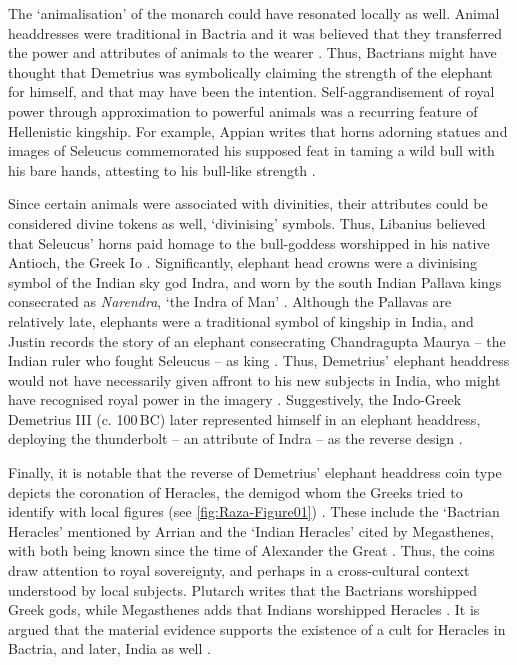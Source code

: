 \documentclass{ijsra}
\renewcommand\BC{{\,BC\xspace}}
\begin{document}
The ‘animalisation’ of the monarch could have resonated locally as well. Animal headdresses were traditional in Bactria and it was believed that they transferred the power and attributes of animals to the wearer \parencite[215--226]{Lerner2009}.
Thus, Bactrians might have thought that Demetrius was symbolically claiming the strength of the elephant for himself, and that may have been the intention.
Self-aggrandisement of royal power through approximation to powerful animals was a recurring feature of Hellenistic kingship.
For example, Appian writes that horns adorning statues and images of Seleucus commemorated his supposed feat in taming a wild bull with his bare hands,
attesting to his bull-like strength \parencites[53]{Alonso2014}[]{App. Syr. 57}[120]{Erickson2013}.

Since certain animals were associated with divinities, their attributes could be considered divine tokens as well, ‘divinising’ symbols.
Thus, Libanius believed that Seleucus’ horns paid homage to the bull-goddess worshipped in his native Antioch, the Greek Io \parencites[121]{Erickson2013}[]{Lib. Or. 11.92}.
Significantly, elephant head crowns were a divinising symbol of the Indian sky god Indra, and worn by the south Indian Pallava kings consecrated as \emph{Narendra}, ‘the Indra of Man’ \parencite[66--70]{Hudson2008}.
Although the Pallavas are relatively late, elephants were a traditional symbol of kingship in India, and Justin records the story of an elephant consecrating Chandragupta Maurya – the Indian ruler who fought Seleucus – as king \parencite[]{Justin. Ep. 15.4}.
Thus, Demetrius’ elephant headdress would not have necessarily given affront to his new subjects in India, who might have recognised royal power in the imagery \parencite[465]{Narain2003}.
Suggestively, the Indo-Greek Demetrius III (c. 100\BC) later represented himself in an elephant headdress, deploying the thunderbolt – an attribute of Indra – as the reverse design \parencite[17--18]{Kalita1997}.  

Finally, it is notable that the reverse of Demetrius’ elephant headdress coin type depicts the coronation of Heracles, the demigod whom the Greeks tried to identify with local figures (see \cref{fig:Raza-Figure01}) \parencites[70--80]{Bukharin2004}[140]{Stanco2012}.
These include the ‘Bactrian Heracles’ mentioned by Arrian and the ‘Indian Heracles’ cited by Megasthenes, with both being known since the time of Alexander the Great \parencites[]{Arr. Anab. 4.28}[]{Arr. Ind. 8.4}.
Thus, the coins draw attention to royal sovereignty, and perhaps in a cross-cultural context understood by local subjects.
Plutarch writes that the Bactrians worshipped Greek gods,
while Megasthenes adds that Indians worshipped Heracles \parencites[]{Arr. Ind. 8.4}[]{Plut. Mor. 328d}[420]{Potter2003}.
It is argued that the material evidence supports the existence of a cult for Heracles in Bactria, and later, India as well \parencite[248]{Stanco2012}. 
\end{document}
